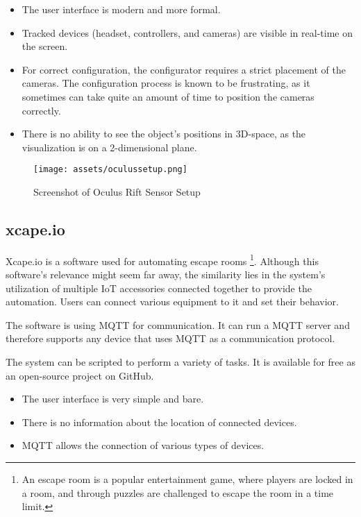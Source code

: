 \begin{itemize}
\item The user interface is modern and more formal.
\item Tracked devices (headset, controllers, and cameras) are visible in real-time
on the screen.
\item For correct configuration, the configurator requires a strict placement
of the cameras. The configuration process is known to be frustrating,
as it sometimes can take quite an amount of time to position the cameras correctly.
\item There is no ability to see the object’s positions in 3D-space, as the visualization is
on a 2-dimensional plane.
\end{itemize}

\begin{figure}[h]{}
\centering\texttt{[image: assets/oculussetup.png]}
\caption{Screenshot of Oculus Rift Sensor Setup}
\end{figure}

\hypertarget{x-xcape.io}{\subsection{xcape.io}}
Xcape.io is a software used for automating escape rooms
\footnote{An escape room is a popular entertainment game, where players are locked in a room, and through puzzles are challenged to escape the room in a time limit.}.
Although this software’s relevance might seem far away,
the similarity lies in the system’s utilization of multiple IoT accessories
connected together to provide the automation. Users can connect various
equipment to it and set their behavior.

The software is using MQTT for communication. It can run a MQTT server and
therefore supports any device that uses MQTT as a communication protocol.

The system can be scripted to perform a variety of tasks. It is available
for free as an open-source project on GitHub.

\begin{itemize}
    \item The user interface is very simple and bare.
    \item There is no information about the location of connected devices.
    \item MQTT allows the connection of various types of devices.
\end{itemize}
